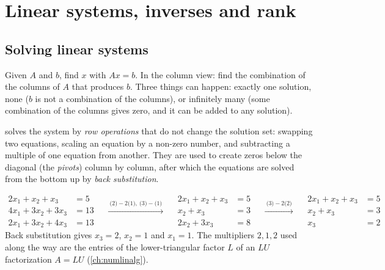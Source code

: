\section{Linear systems, inverses and rank}
\label{sec:linsys}

\subsection{Solving linear systems}

Given $A$ and $b$, find $x$ with $Ax = b$. In the column view: find the combination of the columns of $A$ that
produces $b$. Three things can happen: exactly one solution, none ($b$ is not a combination of the columns), or
infinitely many (some combination of the columns gives zero, and it can be added to any solution).

 solves the system by \emph{row operations} that do not change the solution set:
swapping two equations, scaling an equation by a non-zero number, and subtracting a multiple of one equation from
another. They are used to create zeros below the diagonal (the \emph{pivots}) column by column, after which the
equations are solved from the bottom up by \emph{back substitution}.

\begin{example}[Elimination]
\begin{equation*}
\begin{aligned}
  2x_1 + x_2 + x_3 &= 5 \\ 4x_1 + 3x_2 + 3x_3 &= 13 \\ 2x_1 + 3x_2 + 4x_3 &= 13
\end{aligned}
\quad\xrightarrow{\ \text{(2)}-2\text{(1)},\ \text{(3)}-\text{(1)}\ }\quad
\begin{aligned}
  2x_1 + x_2 + x_3 &= 5 \\ x_2 + x_3 &= 3 \\ 2x_2 + 3x_3 &= 8
\end{aligned}
\quad\xrightarrow{\ \text{(3)}-2\text{(2)}\ }\quad
\begin{aligned}
  2x_1 + x_2 + x_3 &= 5 \\ x_2 + x_3 &= 3 \\ x_3 &= 2
\end{aligned}
\end{equation*}
Back substitution gives $x_3 = 2$, $x_2 = 1$ and $x_1 = 1$. The multipliers $2, 1, 2$ used along the way are the entries
of the lower-triangular factor $L$ of an $LU$ factorization $A = LU$ (\cref{ch:numlinalg}).
\end{example}

